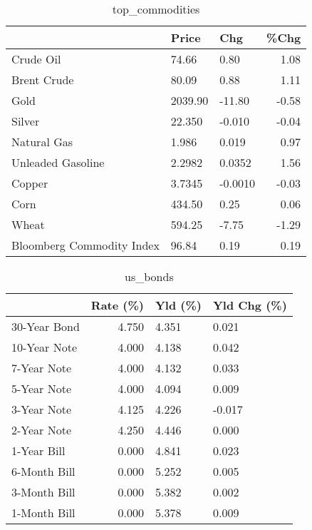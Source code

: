 \documentclass{article}%
\begin{document}
\begin{table}[htbp]%
\caption{top\_commodities}%
\centering%
\begin{adjustbox}{width=1\textwidth}%
\begin{tabular}{lllr}
\toprule
                          &   Price &     Chg &  \%Chg \\
\midrule
               Crude Oil  &   74.66 &    0.80 &  1.08 \\
             Brent Crude  &   80.09 &    0.88 &  1.11 \\
                    Gold  & 2039.90 &  -11.80 & -0.58 \\
                  Silver  &  22.350 &  -0.010 & -0.04 \\
             Natural Gas  &   1.986 &   0.019 &  0.97 \\
       Unleaded Gasoline  &  2.2982 &  0.0352 &  1.56 \\
                  Copper  &  3.7345 & -0.0010 & -0.03 \\
                    Corn  &  434.50 &    0.25 &  0.06 \\
                   Wheat  &  594.25 &   -7.75 & -1.29 \\
Bloomberg Commodity Index &   96.84 &    0.19 &  0.19 \\
\bottomrule
\end{tabular}
%
\end{adjustbox}%
\end{table}

%


\begin{table}[htbp]%
\caption{us\_bonds}%
\centering%
\begin{adjustbox}{width=1\textwidth}%
\begin{tabular}{lrll}
\toprule
             &  Rate (\%) & Yld (\%) & Yld Chg (\%) \\
\midrule
30-Year Bond &     4.750 &   4.351 &       0.021 \\
10-Year Note &     4.000 &   4.138 &       0.042 \\
 7-Year Note &     4.000 &   4.132 &       0.033 \\
 5-Year Note &     4.000 &   4.094 &       0.009 \\
 3-Year Note &     4.125 &   4.226 &      -0.017 \\
 2-Year Note &     4.250 &   4.446 &       0.000 \\
 1-Year Bill &     0.000 &   4.841 &       0.023 \\
6-Month Bill &     0.000 &   5.252 &       0.005 \\
3-Month Bill &     0.000 &   5.382 &       0.002 \\
1-Month Bill &     0.000 &   5.378 &       0.009 \\
\bottomrule
\end{tabular}
%
\end{adjustbox}%
\end{table}
\end{document}

